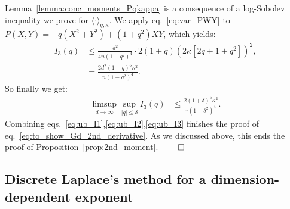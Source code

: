 \noindent
Lemma~\ref{lemma:conc_moments_Pqkappa} is a consequence of a log-Sobolev inequality we prove for $\langle \cdot \rangle_{q,\kappa}$.
We apply eq.~\eqref{eq:var_PWY} to $P(X, Y) = - q (X^2+Y^2) + (1+q^2) XY$, which yields:
\begin{align*}
    I_3(q) &\leq \frac{d^2}{4 n (1-q^2)^4} \cdot 2(1+q) \left(2 \kappa [2 q + 1+q^2]\right)^2, \\ 
    &= \frac{2d^2 (1+q)^5 \kappa^2}{n (1-q^2)^4}.
\end{align*}
So finally we get:
\begin{align}\label{eq:ub_I3}
    \limsup_{d \to \infty} \sup_{|q| \leq \delta} I_3(q) &\leq \frac{2(1+\delta)^5 \kappa^2}{\tau (1-\delta^2)^4}.
\end{align}
Combining eqs.~\eqref{eq:ub_I1},\eqref{eq:ub_I2},\eqref{eq:ub_I3} finishes the proof of eq.~\eqref{eq:to_show_Gd_2nd_derivative}. 
As we discussed above, this ends the proof of Proposition~\ref{prop:2nd_moment}.
$\qed$

\subsection{Discrete Laplace's method for a dimension-dependent exponent}\label{subsec:proof_laplace_discrete}

